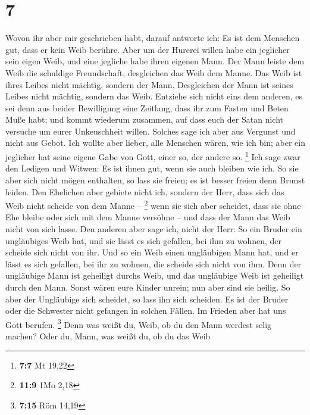 \hypertarget{section-6}{%
\section{7}\label{section-6}}

 Wovon ihr aber mir geschrieben habt, darauf antworte ich:
Es ist dem Menschen gut, dass er kein Weib berühre.  Aber
um der Hurerei willen habe ein jeglicher sein eigen Weib, und eine
jegliche habe ihren eigenen Mann.  Der Mann leiste dem
Weib die schuldige Freundschaft, desgleichen das Weib dem Manne.
 Das Weib ist ihres Leibes nicht mächtig, sondern der
Mann. Desgleichen der Mann ist seines Leibes nicht mächtig, sondern das
Weib.  Entziehe sich nicht eins dem anderen, es sei denn
aus beider Bewilligung eine Zeitlang, dass ihr zum Fasten und Beten Muße
habt; und kommt wiederum zusammen, auf dass euch der Satan nicht
versuche um eurer Unkeuschheit willen.  Solches sage ich
aber aus Vergunst und nicht aus Gebot.  Ich wollte aber
lieber, alle Menschen wären, wie ich bin; aber ein jeglicher hat seine
eigene Gabe von Gott, einer so, der andere so. \footnote{\textbf{7:7} Mt
  19,22}  Ich sage zwar den Ledigen und Witwen: Es ist
ihnen gut, wenn sie auch bleiben wie ich.  So sie aber
sich nicht mögen enthalten, so lass sie freien; es ist besser freien
denn Brunst leiden.  Den Ehelichen aber gebiete nicht
ich, sondern der Herr, dass sich das Weib nicht scheide von dem Manne --
\footnote{\textbf{11:9} 1Mo 2,18}  wenn sie sich aber
scheidet, dass sie ohne Ehe bleibe oder sich mit dem Manne versöhne --
und dass der Mann das Weib nicht von sich lasse.  Den
anderen aber sage ich, nicht der Herr: So ein Bruder ein ungläubiges
Weib hat, und sie lässt es sich gefallen, bei ihm zu wohnen, der scheide
sich nicht von ihr.  Und so ein Weib einen ungläubigen
Mann hat, und er lässt es sich gefallen, bei ihr zu wohnen, die scheide
sich nicht von ihm.  Denn der ungläubige Mann ist
geheiligt durchs Weib, und das ungläubige Weib ist geheiligt durch den
Mann. Sonst wären eure Kinder unrein; nun aber sind sie heilig.
 So aber der Ungläubige sich scheidet, so lass ihn sich
scheiden. Es ist der Bruder oder die Schwester nicht gefangen in solchen
Fällen. Im Frieden aber hat uns Gott berufen. \footnote{\textbf{7:15}
  Röm 14,19}  Denn was weißt du, Weib, ob du den Mann
werdest selig machen? Oder du, Mann, was weißt du, ob du das Weib
